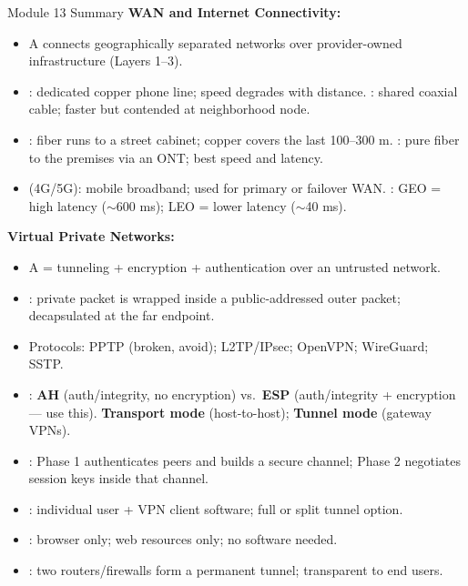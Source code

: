\documentclass[aspectratio=169]{beamer}  %
\begin{document}
\begin{frame}[t,allowframebreaks]{Module 13 Summary}
    \small
    \textbf{WAN and Internet Connectivity:}
    \begin{itemize}
        \item A  connects geographically separated networks over provider-owned infrastructure (Layers 1--3).
        \item {}: dedicated copper phone line; speed degrades with distance. : shared coaxial cable; faster but contended at neighborhood node.
        \item {}: fiber runs to a street cabinet; copper covers the last 100--300 m. : pure fiber to the premises via an ONT; best speed and latency.
        \item {} (4G/5G): mobile broadband; used for primary or failover WAN. : GEO = high latency ($\sim$600 ms); LEO = lower latency ($\sim$40 ms).
    \end{itemize}
    \framebreak
    \textbf{Virtual Private Networks:}
    \begin{itemize}
        \item A  = tunneling + encryption + authentication over an untrusted network.
        \item {}: private packet is wrapped inside a public-addressed outer packet; decapsulated at the far endpoint.
        \item Protocols: PPTP (broken, avoid); L2TP/IPsec; OpenVPN; WireGuard; SSTP.
        \item {}: \textbf{AH} (auth/integrity, no encryption) vs.\ \textbf{ESP} (auth/integrity + encryption --- use this). \textbf{Transport mode} (host-to-host); \textbf{Tunnel mode} (gateway VPNs).
        \item {}: Phase 1 authenticates peers and builds a secure channel; Phase 2 negotiates session keys inside that channel.
        \item {}: individual user + VPN client software; full or split tunnel option.
        \item {}: browser only; web resources only; no software needed.
        \item {}: two routers/firewalls form a permanent tunnel; transparent to end users.
    \end{itemize}
    \framebreak

\end{frame}
\end{document}
